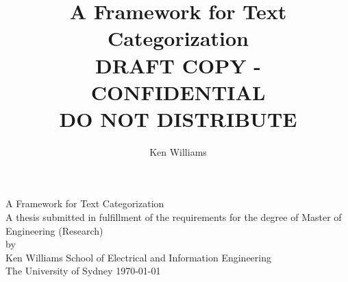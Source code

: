 \documentclass[a4paper,oneside]{book}
\title{A Framework for Text Categorization \\
DRAFT COPY - CONFIDENTIAL \\
DO NOT DISTRIBUTE}
\author{Ken Williams}
\begin{document}
\frontmatter

\begin{titlepage}
\begin{center}
      \mbox{}
      \vspace{1in}
      \vfill
      {\huge A Framework for Text Categorization}\\
      \vfill
      \vfill
      A thesis submitted in fulfillment of the requirements for the degree of
      \vfill
      {\Large Master of Engineering (Research)}\\[6pt]
      by\\[6pt]
      {\Large Ken Williams}
      \vfill
      \vfill
      School of Electrical and Information Engineering\\
      The University of Sydney
      \vfill
      \today
      \vspace*{1.5in}
\end{center}
\end{titlepage}




\tableofcontents
\clearpage
{}
\listoffigures
\clearpage
{}
\listoftables

\mainmatter







\appendix

%
%

\backmatter


\end{document}
